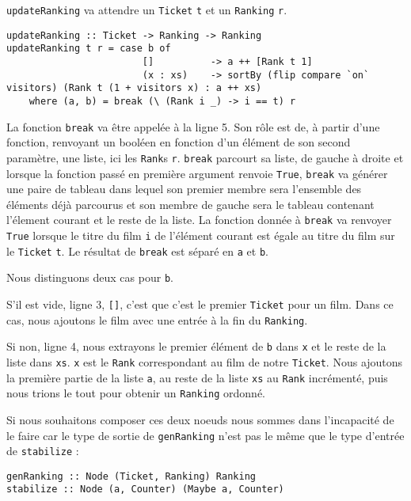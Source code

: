 \documentclass{llncs}
\begin{document}
\lstinline{updateRanking} va attendre un \lstinline{Ticket} \lstinline{t} et un
\lstinline{Ranking} \lstinline{r}.
\begin{lstlisting}
updateRanking :: Ticket -> Ranking -> Ranking
updateRanking t r = case b of
                        []          -> a ++ [Rank t 1]
                        (x : xs)    -> sortBy (flip compare `on` visitors) (Rank t (1 + visitors x) : a ++ xs)
    where (a, b) = break (\ (Rank i _) -> i == t) r
\end{lstlisting}
La fonction \lstinline{break} va être appelée à la ligne 5.
Son rôle est de, à partir d'une fonction, renvoyant un booléen en fonction d'un
élément de son second paramètre, une liste, ici les \lstinline{Rank}s \lstinline{r}.
\lstinline{break} parcourt sa liste, de gauche à droite et lorsque la fonction passé
en première argument renvoie \lstinline{True}, \lstinline{break} va générer une
paire de tableau dans lequel son premier membre sera l'ensemble des éléments déjà
parcourus et son membre de gauche sera le tableau contenant l'élement courant et
le reste de la liste.
La fonction donnée à \lstinline{break} va renvoyer \lstinline{True} lorsque le titre
du film \lstinline{i} de l'élément courant est égale au titre du film sur le
\lstinline{Ticket} \lstinline{t}.
Le résultat de \lstinline{break} est séparé en \lstinline{a} et \lstinline{b}.

Nous distinguons deux cas pour \lstinline{b}.

S'il est vide, ligne 3, \lstinline{[]}, c'est que c'est le premier \lstinline{Ticket}
pour un film.
Dans ce cas, nous ajoutons le film avec une entrée à la fin du \lstinline{Ranking}.

Si non, ligne 4, nous extrayons le premier élément de \lstinline{b} dans \lstinline{x}
et le reste de la liste dans \lstinline{xs}.
\lstinline{x} est le \lstinline{Rank} correspondant au film de notre \lstinline{Ticket}.
Nous ajoutons la première partie de la liste \lstinline{a}, au reste de la liste
\lstinline{xs} au \lstinline{Rank} incrémenté, puis nous trions le tout pour obtenir
un \lstinline{Ranking} ordonné.

Si nous souhaitons composer ces deux noeuds nous sommes dans l'incapacité de le
faire car le type de sortie de \lstinline{genRanking} n'est pas le même que le
type d'entrée de \lstinline{stabilize} :
\begin{lstlisting}
genRanking :: Node (Ticket, Ranking) Ranking
stabilize :: Node (a, Counter) (Maybe a, Counter)
\end{lstlisting}
\end{document}
